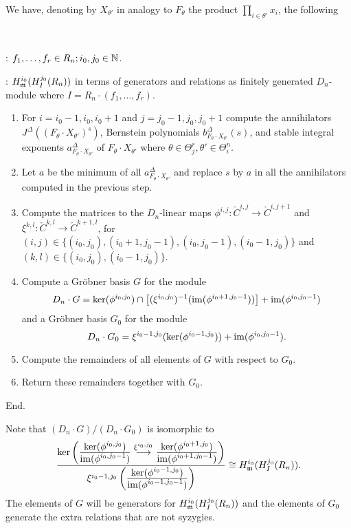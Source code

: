 We have, denoting by $X_{\theta'}$
in analogy to $F_\theta$ the product $\prod_{i\in
\theta'}x_i$,
 the following 
\begin{alg}~

: $f_1,\ldots,f_r\in R_n; i_0,j_0\in {\mathbb N}$.

: 
$H^{i_0}_{\mathfrak m} (H^{j_0}_I(R_n))$ in terms of generators and relations as
finitely generated $D_n$-module where $I=R_n\cdot(f_1,\ldots,f_r)$.

\begin{enumerate}
\item For $i=i_0-1, i_0, i_0+1$ and $j=j_0-1,j_0,j_0+1$ compute the
annihilators $J^\Delta((F_\theta\cdot X_{\theta'})^s)$, Bernstein
polynomials $b^\Delta_{F_\theta\cdot X_{\theta'}}(s)$, and stable
integral exponents $a^\Delta_{F_\theta\cdot X_{\theta '}}$  
of $F_\theta\cdot
X_{\theta'}$ 
where $\theta \in \Theta^r_j, \theta'\in \Theta^n_i$.

\item Let $a$ be the minimum of all $a^\Delta_{F_\theta\cdot X_{\theta '}}$
and replace $s$ by $a$ in all the annihilators
computed in the previous step.

\item Compute the matrices to the $D_n$-linear maps
 $\phi^{i,j}:\check C^{i,j}\to 
\check C^{i,j+1}$ 
and $\xi^{k,l}:\check C^{k,l}\to \check C^{k+1,l}$, for
$(i,j)\in\{(i_0,j_0),(i_0+1,j_0-1),(i_0,j_0-1),(i_0-1,j_0)\}$ and 
$(k,l)\in \{(i_0,j_0),(i_0-1,j_0)\}$. 
\item Compute a Gr\"obner basis $G$ for the module 
\[
D_n\cdot G=\ker(\phi^{i_0,j_0})\cap
\left[ 
(\xi^{i_0,j_0})^{-1}(\operatorname{im}(\phi^{i_0+1,j_0-1}))\right]+\operatorname{im}(\phi^{i_0,j_0-1})
\] 
and a Gr\"obner basis $G_0$ for the module
\[
D_n\cdot
G_0=\xi^{i_0-1,j_0}(\ker(\phi^{i_0-1,j_0}))+\operatorname{im}(\phi^{i_0,j_0-1}).
\]
\item Compute the remainders of all elements of $G$ with
respect to $G_0$. 

\item Return these remainders together with $G_0$.
\end{enumerate}
End.
\end{alg}

Note that $(D_n\cdot G)/(D_n\cdot G_0)$ is isomorphic to
\[\frac{
 \ker\left(\frac{\displaystyle\ker(\phi^{i_0,j_0})}
            {\displaystyle\operatorname{im}(\phi^{i_0,j_0-1})}
      \stackrel{\xi^{i_0,j_0}}{\longrightarrow}
      \frac{\displaystyle\ker(\phi^{i_0+1,j_0})}
            {\displaystyle\operatorname{im}(\phi^{i_0+1,j_0-1})}\right)}
 {\xi^{i_0-1,j_0}\left(
      \frac{\displaystyle\ker(\phi^{i_0-1,j_0})}
           {\displaystyle\operatorname{im}(\phi^{i_0-1,j_0-1})}\right)}\cong H^{i_0}_{\mathfrak m}(H^{j_0}_I(R_n)).
\]
The elements of $G$ will be generators for $H^{i_0}_{\mathfrak m}
(H^{j_0}_I(R_n))$ and 
the elements of $G_0$ generate the extra relations that are not
syzygies.

